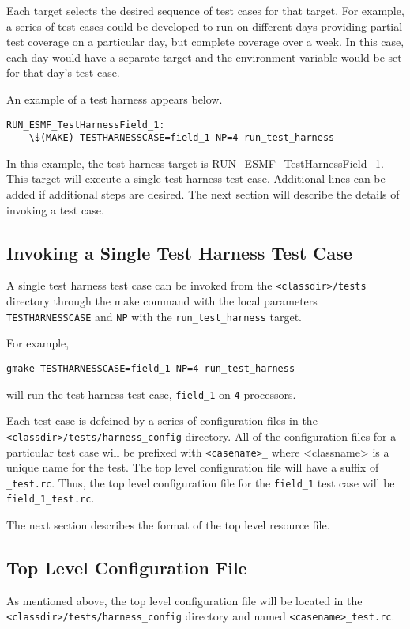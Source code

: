 Each target selects the desired sequence of test cases for that target.
For example, a series of test cases could be developed to run on different days providing partial
test coverage on a particular day, but complete coverage over a week.
In this case, each day would have a separate target and the environment variable would be set for
that day's test case.

An example of a test harness appears below.
\begin{verbatim}
RUN_ESMF_TestHarnessField_1:
	\$(MAKE) TESTHARNESSCASE=field_1 NP=4 run_test_harness
\end{verbatim}

In this example, the test harness target is RUN\_ESMF\_TestHarnessField\_1.  This target will execute a
single test harness test case. Additional lines can be added if additional steps are desired.
The next section will describe the details of invoking a test case.

\subsection{Invoking a Single Test Harness Test Case}
A single test harness test case can be invoked from the \texttt{<classdir>/tests}
directory through the make command with the local parameters \texttt{TESTHARNESSCASE} and
\texttt{NP} with the \texttt{run\_test\_harness} target.

For example,
\begin{verbatim}
gmake TESTHARNESSCASE=field_1 NP=4 run_test_harness
\end{verbatim}
will run the test harness test case, \texttt{field\_1} on \texttt{4} processors.

Each test case is defeined by a series of configuration files in the
\texttt{<classdir>/tests/harness\_config} directory.  
All of the configuration files for a particular test case will be prefixed with 
\texttt{<casename>\_} where <classname> is a unique name for the test. 
The top level configuration file will have a suffix of \texttt{\_test.rc}.
Thus, the top level configuration file for the \texttt{field\_1} test case will be
\texttt{field\_1\_test.rc}.

The next section describes the format of the top level resource file.

\subsection{Top Level Configuration File}
\label{sec:harness_toplevelfile}
As mentioned above, the top level configuration file will be located in the 
\texttt{<classdir>/tests/harness\_config} directory and named \texttt{<casename>\_test.rc}.
 
